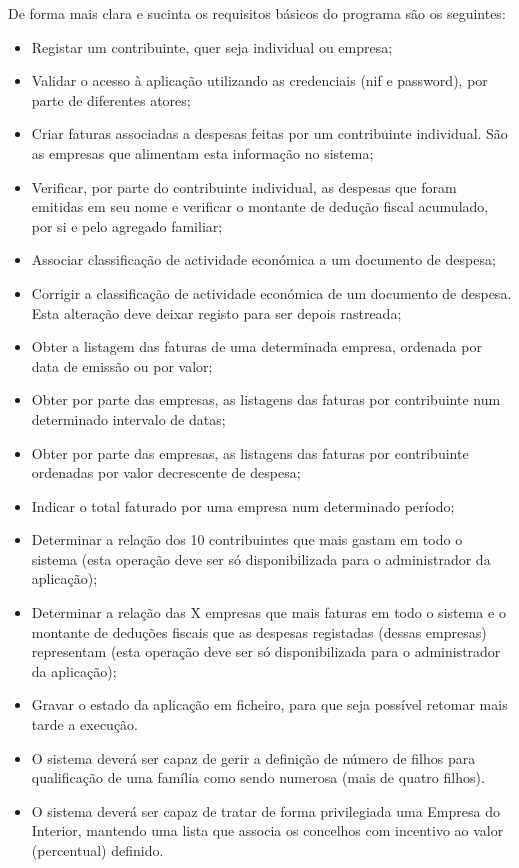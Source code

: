 \documentclass[a4paper]{article}
\begin{document}
\vspace{0.2cm}

De forma mais clara e sucinta os requisitos básicos do programa são os seguintes:

\begin{itemize}
\item Registar um contribuinte, quer seja individual ou empresa;
\item Validar o acesso à aplicação utilizando as credenciais (nif e password), por parte
de diferentes atores;
\item Criar faturas associadas a despesas feitas por um contribuinte individual.
São as empresas que alimentam esta informação no sistema;
\item Verificar, por parte do contribuinte individual, as despesas que foram emitidas
em seu nome e verificar o montante de dedução fiscal acumulado, por si e pelo agregado familiar;
\item Associar classificação de actividade económica a um documento de despesa;
\item Corrigir a classificação de actividade económica de um documento de despesa.
Esta alteração deve deixar registo para ser depois rastreada;
\item Obter a listagem das faturas de uma determinada empresa, ordenada por data
de emissão ou por valor;
\item Obter por parte das empresas, as listagens das faturas por contribuinte num
determinado intervalo de datas;
\item Obter por parte das empresas, as listagens das faturas por contribuinte ordenadas
por valor decrescente de despesa;
\item Indicar o total faturado por uma empresa num determinado período;
\item Determinar a relação dos 10 contribuintes que mais gastam em todo o sistema (esta operação
deve ser só disponibilizada para o administrador da aplicação);
\item Determinar a relação das X empresas que mais faturas em todo o sistema e
o montante de deduções fiscais que as despesas registadas (dessas empresas)
representam (esta operação deve ser só disponibilizada para o administrador da aplicação);
\item Gravar o estado da aplicação em ficheiro, para que seja possível retomar mais tarde a execução.
\item O sistema deverá ser capaz de gerir a definição de número de filhos para qualificação
de uma família como sendo numerosa (mais de quatro filhos).
\item O sistema deverá ser capaz de tratar de forma privilegiada uma Empresa do Interior,
 mantendo uma lista que associa os concelhos com incentivo ao valor (percentual) definido.
\end{itemize}
\end{document}
